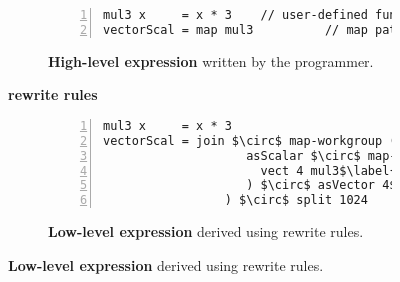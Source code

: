 \begin{figure}[b]
\centering

\begin{subfigure}[b]{.85\linewidth}
\begin{lstlisting}[mathescape,numbers=left]
mul3 x     = x * 3    // user-defined function
vectorScal = map mul3          // map pattern
\end{lstlisting}
\caption{\textbf{High-level expression} written by the programmer.}
\label{fig:codeex:map}
\end{subfigure}

\begin{minipage}{0.1\linewidth}
\vspace{0pt}
\centering
{}
\end{minipage}
\begin{minipage}{0.25\linewidth}
\vspace{-5pt}
\centering
\textbf{rewrite rules}
\end{minipage}
\begin{minipage}{0.1\linewidth}
\vspace{0pt}
\centering
{}
\end{minipage}

\begin{subfigure}[b]{\linewidth}
\centering
\begin{minipage}{.85\linewidth}%
\begin{lstlisting}[mathescape,numbers=left]
mul3 x     = x * 3
vectorScal = join $\circ$ map-workgroup ($\label{fig:codeex:impl:map-wg}$
                    asScalar $\circ$ map-local ($\label{fig:codeex:impl:map-wg:start}$
                      vect 4 mul3$\label{fig:codeex:impl:vec}$
                    ) $\circ$ asVector 4$\label{fig:codeex:impl:map-wg:stop}$$\label{fig:codeex:impl:asVec}$
                 ) $\circ$ split 1024
\end{lstlisting}
\end{minipage}
\caption{\textbf{Low-level expression} derived using rewrite rules.}
\label{fig:codeex:impl}
\end{subfigure}


\end{figure}
